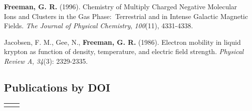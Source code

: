 \documentclass[
    10pt, %
]{FreemanCV}
\begin{document}
\begin{paracol}{2}

\textbf{Freeman, G. R.} (1996). Chemistry of Multiply Charged Negative Molecular Ions and Clusters in the Gas Phase:  Terrestrial and in Intense Galactic Magnetic Fields. \textit{The Journal of Physical Chemistry}, \textit{100}(11), 4331-4338.

\medskip %

Jacobsen, F. M., Gee, N., \textbf{Freeman, G. R.} (1986). Electron mobility in liquid krypton as function of density, temperature, and electric field strength. \textit{Physical Review A}, \textit{34}(3): 2329-2335.

\medskip %







\subsection{Publications by DOI}

\begin{supertabular}{r l} %








\end{supertabular}
\end{paracol}
\end{document}
